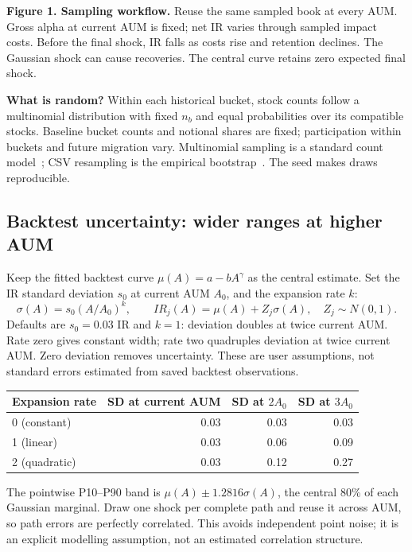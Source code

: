 \documentclass[11pt,a4paper]{article}
\begin{document}
{\small\textbf{Figure 1. Sampling workflow.} Reuse the same sampled book at every AUM. Gross alpha at current AUM is fixed; net IR varies through sampled impact costs. Before the final shock, IR falls as costs rise and retention declines. The Gaussian shock can cause recoveries. The central curve retains zero expected final shock.}

\textbf{What is random?} Within each historical bucket, stock counts follow a multinomial distribution with fixed $n_b$ and equal probabilities over its compatible stocks. Baseline bucket counts and notional shares are fixed; participation within buckets and future migration vary. Multinomial sampling is a standard count model~\cite{agresti}; CSV resampling is the empirical bootstrap~\cite{efron}. The seed makes draws reproducible.

\newpage
\subsection{Backtest uncertainty: wider ranges at higher AUM}
Keep the fitted backtest curve $\mu(A)=a-bA^\gamma$ as the central estimate. Set the IR standard deviation $s_0$ at current AUM $A_0$, and the expansion rate $k$:
\[
\sigma(A)=s_0(A/A_0)^k,\qquad
IR_j(A)=\mu(A)+Z_j\sigma(A),\quad Z_j\sim N(0,1).
\]
Defaults are $s_0=0.03$ IR and $k=1$: deviation doubles at twice current AUM. Rate zero gives constant width; rate two quadruples deviation at twice current AUM. Zero deviation removes uncertainty. These are user assumptions, not standard errors estimated from saved backtest observations.

\begin{center}
\begin{tabular}{@{}lrrr@{}}
\toprule
Expansion rate & SD at current AUM & SD at $2A_0$ & SD at $3A_0$ \\
\midrule
0 (constant) & 0.03 & 0.03 & 0.03 \\
1 (linear) & 0.03 & 0.06 & 0.09 \\
2 (quadratic) & 0.03 & 0.12 & 0.27 \\
\bottomrule
\end{tabular}
\end{center}

The pointwise P10--P90 band is $\mu(A)\pm1.2816\sigma(A)$, the central 80\% of each Gaussian marginal. Draw one shock per complete path and reuse it across AUM, so path errors are perfectly correlated. This avoids independent point noise; it is an explicit modelling assumption, not an estimated correlation structure.
\end{document}

